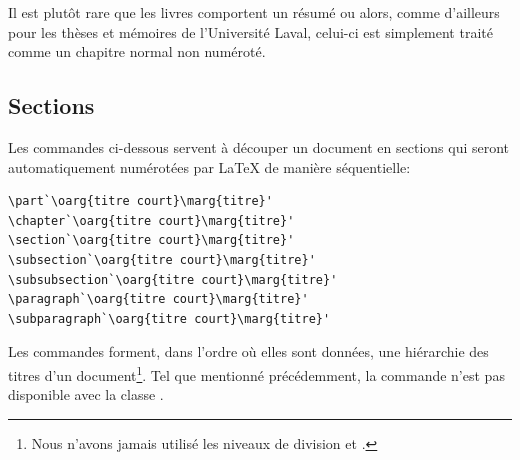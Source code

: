 Il est plutôt rare que les livres comportent un résumé ou alors, comme
d'ailleurs pour les thèses et mémoires de l'Université Laval, celui-ci
est simplement traité comme un chapitre normal non numéroté.

\subsection{Sections}
\label{sec:organisation:parties:sections}

Les commandes ci-dessous servent à découper un document en sections
qui seront automatiquement numérotées par {\LaTeX} de manière
séquentielle:
\begin{lstlisting}
\part`\oarg{titre court}\marg{titre}'
\chapter`\oarg{titre court}\marg{titre}'
\section`\oarg{titre court}\marg{titre}'
\subsection`\oarg{titre court}\marg{titre}'
\subsubsection`\oarg{titre court}\marg{titre}'
\paragraph`\oarg{titre court}\marg{titre}'
\subparagraph`\oarg{titre court}\marg{titre}'
\end{lstlisting}
Les commandes forment, dans l'ordre où elles sont données, une
hiérarchie des titres d'un document\footnote{%
  Nous n'avons jamais utilisé les niveaux de division
  \cmdprint{\paragraph} et \cmdprint{\subparagraph}.}. %
Tel que mentionné précédemment, la commande \cmd{\chapter} n'est pas
disponible avec la classe .

